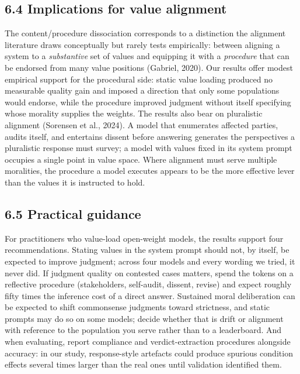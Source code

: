 \documentclass[
  11pt,
]{article}
\begin{document}
\subsection{6.4 Implications for value
alignment}\label{implications-for-value-alignment}

The content/procedure dissociation corresponds to a distinction the
alignment literature draws conceptually but rarely tests empirically:
between aligning a system to a \emph{substantive} set of values and
equipping it with a \emph{procedure} that can be endorsed from many
value positions (Gabriel, 2020). Our results offer modest empirical
support for the procedural side: static value loading produced no
measurable quality gain and imposed a direction that only some
populations would endorse, while the procedure improved judgment without
itself specifying whose morality supplies the weights. The results also
bear on pluralistic alignment (Sorensen et al., 2024). A model that
enumerates affected parties, audits itself, and entertains dissent
before answering generates the perspectives a pluralistic response must
survey; a model with values fixed in its system prompt occupies a single
point in value space. Where alignment must serve multiple moralities,
the procedure a model executes appears to be the more effective lever
than the values it is instructed to hold.

\subsection{6.5 Practical guidance}\label{practical-guidance}

For practitioners who value-load open-weight models, the results support
four recommendations. Stating values in the system prompt should not, by
itself, be expected to improve judgment; across four models and every
wording we tried, it never did. If judgment quality on contested cases
matters, spend the tokens on a reflective procedure (stakeholders,
self-audit, dissent, revise) and expect roughly fifty times the
inference cost of a direct answer. Sustained moral deliberation can be
expected to shift commonsense judgments toward strictness, and static
prompts may do so on some models; decide whether that is drift or
alignment with reference to the population you serve rather than to a
leaderboard. And when evaluating, report compliance and
verdict-extraction procedures alongside accuracy: in our study,
response-style artefacts could produce spurious condition effects
several times larger than the real ones until validation identified
them.
\end{document}
